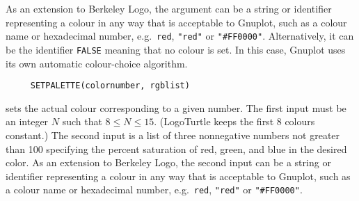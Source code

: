 As an extension to Berkeley Logo, the argument can be a string or
identifier representing a colour in any way that is acceptable to
Gnuplot, such as a colour name or hexadecimal number,
e.g.\ \texttt{red}, \texttt{"red"} or \texttt{"\#FF0000"}.
Alternatively, it can be the identifier \texttt{FALSE} meaning that no
colour is set.  In this case, Gnuplot uses its own automatic
colour-choice algorithm.

\begin{verbatim}
     SETPALETTE(colornumber, rgblist)
\end{verbatim}
sets the actual colour corresponding to a given number.  The first
input must be an integer $N$ such that $8 \le N \le 15$. (LogoTurtle
keeps the first 8 colours constant.)  The second input is a list of
three nonnegative numbers not greater than 100 specifying the percent
saturation of red, green, and blue in the desired color.  As an
extension to Berkeley Logo, the second input can be a string or
identifier representing a colour in any way that is acceptable to
Gnuplot, such as a colour name or hexadecimal number,
e.g.\ \texttt{red}, \texttt{"red"} or \texttt{"\#FF0000"}.





